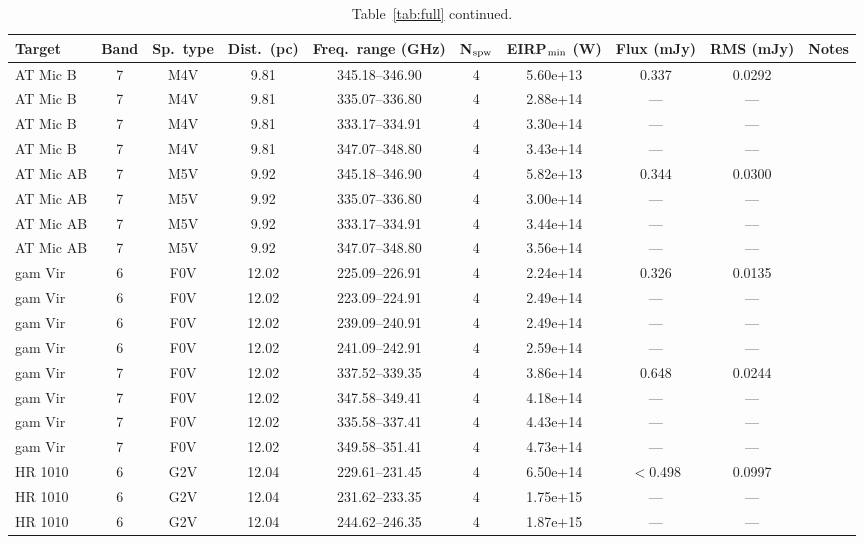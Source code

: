 \documentclass{openjournal}
\begin{document}
\begin{table}
\centering
\scriptsize
\caption{Table~\ref{tab:full} continued.}
\label{tab:full3}
\begin{tabularx}{\textwidth}{@{}l c c c c c c c c X@{}}
\hline
Target & Band & Sp.\ type & Dist.\ (pc) & Freq.\ range (GHz) & N$_{\rm spw}$ & EIRP$_{\rm min}$ (W) & Flux (mJy) & RMS (mJy) & Notes \\
\hline
AT Mic B & 7 & M4V & 9.81 & 345.18--346.90 & 4 & 5.60e+13 & 0.337 & 0.0292 &  \\
AT Mic B & 7 & M4V & 9.81 & 335.07--336.80 & 4 & 2.88e+14 & --- & --- &  \\
AT Mic B & 7 & M4V & 9.81 & 333.17--334.91 & 4 & 3.30e+14 & --- & --- &  \\
AT Mic B & 7 & M4V & 9.81 & 347.07--348.80 & 4 & 3.43e+14 & --- & --- &  \\
AT Mic AB & 7 & M5V & 9.92 & 345.18--346.90 & 4 & 5.82e+13 & 0.344 & 0.0300 &  \\
AT Mic AB & 7 & M5V & 9.92 & 335.07--336.80 & 4 & 3.00e+14 & --- & --- &  \\
AT Mic AB & 7 & M5V & 9.92 & 333.17--334.91 & 4 & 3.44e+14 & --- & --- &  \\
AT Mic AB & 7 & M5V & 9.92 & 347.07--348.80 & 4 & 3.56e+14 & --- & --- &  \\
gam Vir & 6 & F0V & 12.02 & 225.09--226.91 & 4 & 2.24e+14 & 0.326 & 0.0135 &  \\
gam Vir & 6 & F0V & 12.02 & 223.09--224.91 & 4 & 2.49e+14 & --- & --- &  \\
gam Vir & 6 & F0V & 12.02 & 239.09--240.91 & 4 & 2.49e+14 & --- & --- &  \\
gam Vir & 6 & F0V & 12.02 & 241.09--242.91 & 4 & 2.59e+14 & --- & --- &  \\
gam Vir & 7 & F0V & 12.02 & 337.52--339.35 & 4 & 3.86e+14 & 0.648 & 0.0244 &  \\
gam Vir & 7 & F0V & 12.02 & 347.58--349.41 & 4 & 4.18e+14 & --- & --- &  \\
gam Vir & 7 & F0V & 12.02 & 335.58--337.41 & 4 & 4.43e+14 & --- & --- &  \\
gam Vir & 7 & F0V & 12.02 & 349.58--351.41 & 4 & 4.73e+14 & --- & --- &  \\
HR 1010 & 6 & G2V & 12.04 & 229.61--231.45 & 4 & 6.50e+14 & $<$0.498 & 0.0997 &  \\
HR 1010 & 6 & G2V & 12.04 & 231.62--233.35 & 4 & 1.75e+15 & --- & --- &  \\
HR 1010 & 6 & G2V & 12.04 & 244.62--246.35 & 4 & 1.87e+15 & --- & --- &  \\

\end{tabularx}
\end{table}
\end{document}
